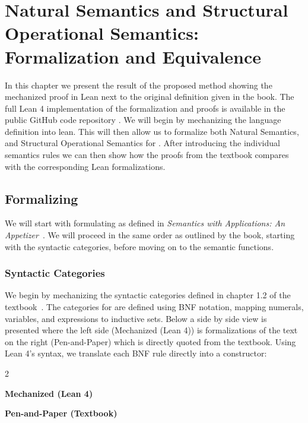 
%
%
%
%
%
%
\chapter{Natural Semantics and Structural Operational Semantics: Formalization and Equivalence}
\label{formal_ns_sos_equiv}
In this chapter we present the result of the proposed method showing the mechanized proof in Lean next to the original definition given in the book.
The full Lean 4 implementation of the formalization and proofs is available in the public GitHub code repository \citep{bachelor_thesis_code_repo}.
We will begin by mechanizing the \While language definition into lean.
This will then allow us to formalize both Natural Semantics, and Structural Operational Semantics
for \While. After introducing the individual semantics rules we can then show
how the proofs from the textbook compares with the corresponding Lean formalizations.


%
%
%
\section{Formalizing \While}
\label{formal_ns_sos_equiv:sec:while:formalization}
We will start with formulating \While as defined in \emph{Semantics with Applications: An Appetizer}~\citep{nielson_semantics_2007}.
We will proceed in the same order as outlined by the book, starting with the syntactic categories,
before moving on to the semantic functions.


\subsection*{Syntactic Categories}
We begin by mechanizing the syntactic categories defined in chapter 1.2 of the textbook~\citep[p.~7]{nielson_semantics_2007}. 
The categories for \While are defined using BNF notation, mapping numerals, variables, and expressions to inductive sets.
Below a side by side view is presented where the left side (Mechanized (Lean 4)) is formalizations of the text on the right
(Pen-and-Paper) which is directly quoted from the textbook.
Using Lean 4's syntax, we translate each BNF rule directly into a constructor:
\newpage
\begin{paracol}{2}
    \begin{leftcolumn}
        \centering \textbf{Mechanized (Lean 4)}
    \end{leftcolumn}
    \begin{rightcolumn}
        \centering \textbf{Pen-and-Paper (Textbook)} \\\noindent
    \end{rightcolumn}
\end{paracol}
\vspace{1em}

